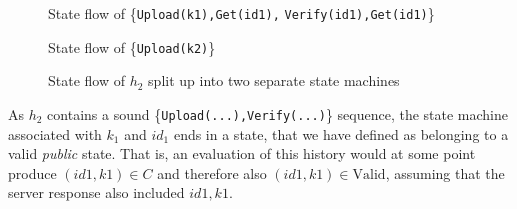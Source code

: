 \begin{figure}[H]
    \begin{minipage}[t]{0.5\textwidth}
        \centering
        \caption*{State flow of \{\texttt{Upload(k1),Get(id1),} \texttt{Verify(id1),Get(id1)}\}}
    \end{minipage}
    \begin{minipage}[t]{0.5\textwidth}
        \centering
        \caption*{State flow of \{\texttt{Upload(k2)}\}}
    \end{minipage}
    \caption{State flow of \(h_{2}\) split up into two separate state machines }
\end{figure}

As \(h_2\) contains a sound \{\texttt{Upload(...),Verify(...)}\} sequence, the state machine associated with \(k_1\) and \(id_1\) ends in a state, that we have defined as belonging to a valid \emph{public} state. That is, an evaluation of this history would at some point produce \((id1,k1) \in C\) and therefore also \((id1,k1) \in \text{Valid}\), assuming that the server response also included \(id1,k1\).